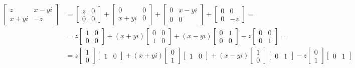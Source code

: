 \begin{align*}
    \begin{bmatrix} z & x-yi\\ x + yi & -z \end{bmatrix} & = \begin{bmatrix} z & 0\\ 0 & 0 \end{bmatrix} + \begin{bmatrix} 0 & 0 \\ x + yi & 0 \end{bmatrix} + \begin{bmatrix} 0 & x-yi\\ 0 & 0 \end{bmatrix} + \begin{bmatrix} 0 & 0 \\ 0 & -z \end{bmatrix} = \\
    & = z \begin{bmatrix} 1 & 0\\ 0 & 0 \end{bmatrix} + (x + yi)\begin{bmatrix} 0 & 0 \\ 1 & 0 \end{bmatrix} + (x-yi)\begin{bmatrix} 0 & 1\\ 0 & 0 \end{bmatrix} - z\begin{bmatrix} 0 & 0 \\ 0 & 1 \end{bmatrix} = \\
    & = z \begin{bmatrix} 1 \\ 0 \end{bmatrix}\begin{bmatrix} 1 & 0 \end{bmatrix} + (x + yi)\begin{bmatrix} 0 \\ 1 \end{bmatrix}\begin{bmatrix} 1 & 0 \end{bmatrix} + (x-yi)\begin{bmatrix} 1 \\ 0 \end{bmatrix}\begin{bmatrix} 0 & 1 \end{bmatrix} - z\begin{bmatrix} 0 \\ 1 \end{bmatrix}\begin{bmatrix} 0 & 1 \end{bmatrix}
\end{align*}
